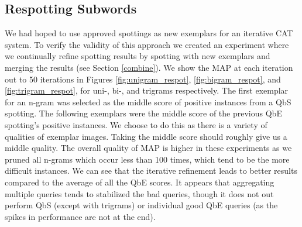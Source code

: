 \documentclass[ms,electronic,twosidetoc,letterpaper,chaptercenter,parttop,lol,lof,lot]{byumsphd}
\begin{document}
\subsection{Respotting Subwords}

We had hoped to use approved spottings as new exemplars for an iterative CAT system. To verify the validity of this approach we created an experiment where we continually refine spotting results by spotting with new exemplars and merging the results (see Section \ref{combine}). We show the MAP at each iteration out to 50 iterations in Figures \ref{fig:unigram_respot}, \ref{fig:bigram_respot}, and \ref{fig:trigram_respot}, for uni-, bi-, and trigrams respectively. The first exemplar for an n-gram was selected as the middle score of positive instances from a QbS spotting. The following exemplars were the middle score of the previous QbE spotting's positive instances. We choose to do this as there is a variety of qualities of exemplar images. Taking the middle score should roughly give us a middle quality. The overall quality of MAP is higher in these experiments as we pruned all n-grams which occur less than 100 times, which tend to be the more difficult instances.
We can see that the iterative refinement leads to better results compared to the average of all the QbE scores. It appears that aggregating multiple queries tends to stabilized the bad queries, though it does not out perform QbS (except with trigrams) or individual good QbE queries (as the spikes in performance are not at the end).
\end{document}
